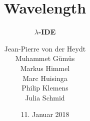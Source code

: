 \documentclass[10pt]{beamer}
\title[] %
{ %
      \textbf{Wavelength}
}
\subtitle[$\lambda$-IDE]
{
      \textbf{$\lambda$-IDE}
}
\author[wavelength]
{      Jean-Pierre von der Heydt \\  
	   Muhammet Gümüs \\
       Markus Himmel \\
       Marc Huisinga \\
       Philip Klemens \\ 
       Julia Schmid   
}
\institute[]
{
      
  
}
\date{11. Januar 2018}
\begin{document}

{
\begin{frame}[plain]
\maketitle
\end{frame}
}


\end{document}
